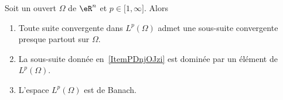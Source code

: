 \begin{theorem} \label{ThoGVmqOro}
    Soit un ouvert \( \Omega\) de \( \eR^n\) et \( p\in\mathopen[ 1 , \infty \mathclose]\). Alors
    \begin{enumerate}
        \item\label{ItemPDnjOJzi}
            Toute suite convergente dans \( L^p(\Omega)\) admet une sous-suite convergente presque partout sur \( \Omega\).
        \item\label{ItemPDnjOJzii}
            La sous-suite donnée en~\ref{ItemPDnjOJzi} est dominée par un élément de \( L^p(\Omega)\).
        \item\label{ItemPDnjOJziii}
            L'espace \( L^p(\Omega)\) est de Banach.
    \end{enumerate}
\end{theorem}

